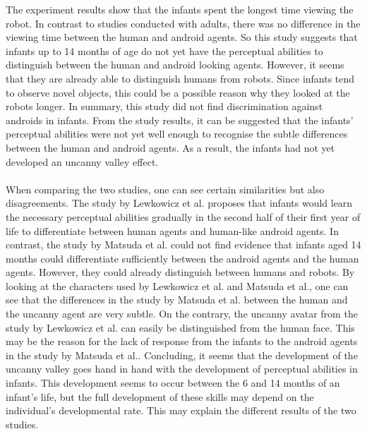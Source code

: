The experiment results show that the infants spent the longest time viewing the robot. In contrast to studies conducted with adults, there was no difference in the viewing time between the human and android agents. So this study suggests that infants up to 14 months of age do not yet have the perceptual abilities to distinguish between the human and android looking agents. However, it seems that they are already able to distinguish humans from robots. Since infants tend to observe novel objects, this could be a possible reason why they looked at the robots longer. In summary, this study did not find discrimination against androids in infants. From the study results, it can be suggested that the infants' perceptual abilities were not yet well enough to recognise the subtle differences between the human and android agents. As a result, the infants had not yet developed an uncanny valley effect.\\\\
When comparing the two studies, one can see certain similarities but also disagreements. The study by Lewkowicz et al. \cite{uncanny_infants} proposes that infants would learn the necessary perceptual abilities gradually in the second half of their first year of life to differentiate between human agents and human-like android agents. In contrast, the study by Matsuda et al. \cite{uncanny_infant_discrimination} could not find evidence that infants aged 14 months could differentiate sufficiently between the android agents and the human agents. However, they could already distinguish between humans and robots. By looking at the characters used by Lewkowicz et al. and Matsuda et al., one can see that the differences in the study by Matsuda et al. between the human and the uncanny agent are very subtle. On the contrary, the uncanny avatar from the study by Lewkowicz et al. can easily be distinguished from the human face. This may be the reason for the lack of response from the infants to the android agents in the study by Matsuda et al.. Concluding, it seems that the development of the uncanny valley goes hand in hand with the development of perceptual abilities in infants. This development seems to occur between the 6 and 14 months of an infant’s life, but the full development of these skills may depend on the individual’s developmental rate. This may explain the different results of the two studies. 
\newpage

